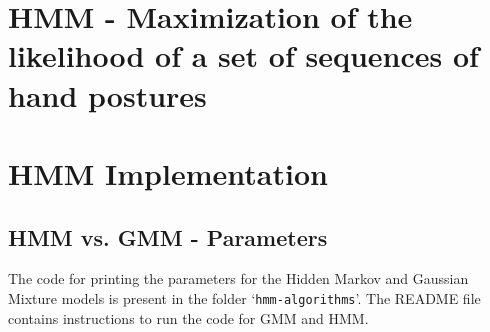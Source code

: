 \documentclass[parskip=half]{scrartcl}
\begin{document}


\newpage


\section{HMM - Maximization of the likelihood of a set of sequences of hand postures} %
\label{sec:hmm_maximization_of_the_likelihood_of_a_set_of_sequences_of_hand_postures}

    



\newpage


\section{HMM Implementation} %
\label{sec:hmm_implementation}


    \subsection{HMM vs. GMM - Parameters} %
    \label{sub:hmm_vs_gmm_parameters}

        The code for printing the parameters for the Hidden Markov and Gaussian Mixture models is present in the folder `\texttt{hmm-algorithms}'. The README file contains instructions to run the code for GMM and HMM.
\end{document}
